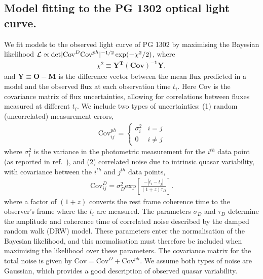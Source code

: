 \subsection{Model fitting to the PG 1302 optical light curve.}
%
We fit models to the observed light curve of PG 1302 by maximising the
Bayesian likelihood $\mathcal{L} \propto {\rm
  det}|{\mbox{Cov}^{D}}{\mbox{Cov}^{ph}}|^{-1/2}\exp(-\chi^2/2)$,
where
%
\begin{align}
\chi^2 \equiv \mathbf{Y^T} \mathbf{(\mbox{Cov})^{-1}}  \mathbf{Y},
\end{align}
%
and $\mathbf{Y} \equiv \mathbf{O} - \mathbf{M}$ is the difference
vector between the mean flux predicted in a model and the observed
flux at each observation time $t_i$. Here $\mbox{Cov}$ is the
covariance matrix of flux uncertainties, allowing for correlations
between fluxes measured at different $t_i$.  We include two types of
uncertainties: (1) random (uncorrelated) measurement errors,
%
\begin{align}
 \mbox{Cov}^{ph}_{ij} = 
 \begin{cases} 
      \sigma^2_i & i=j \\
      0 & i \neq j 
   \end{cases}
\end{align}
%
where $\sigma^2_i$ is the variance in the photometric measurement for the
$i^{th}$ data point (as reported in ref.~\cite{Graham+2015}), and (2)
correlated noise due to intrinsic quasar variability, with covariance
between the $i^{th}$ and $j^{th}$ data points,
%
\begin{align}
\mbox{Cov}^{D}_{ij} = \sigma^2_{D} \mbox{exp}\left[ \frac{-|t_i - t_j|}{(1 + z) \tau_D}\right].
\end{align}
%
where a factor of $(1+z)$ converts the rest frame coherence time to
the observer's frame where the $t_i$ are measured.  The parameters
$\sigma_D$ and $\tau_D$ determine the amplitude and coherence time of
correlated noise described by the damped random walk (DRW)
model\cite{Kelly:2009:DRW}.  These parameters enter the normalisation
of the Bayesian likelihood, and this normalisation must therefore be
included when maximising the likelihood over these
parameters\cite{Kozlowski+2010}. The covariance matrix for the total
noise is given by $\mbox{Cov} = \mbox{Cov}^{D} + \mbox{Cov}^{ph}$. We
assume both types of noise are Gaussian, which provides a good
description of observed quasar variability\cite{Andrae+2013}.

